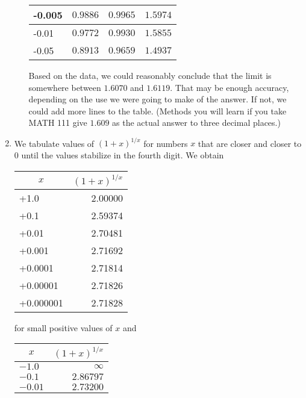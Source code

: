 \documentclass{article}
\begin{document}
\begin{enumerate}
\begin{enumerate}
\begin{center}
\begin{tabular}{|l|r|r|r|}
        \hline
        -0.005  &  $0.9886$ & $0.9965$ & $1.5974$ \\
        \hline
        -0.01   &  $0.9772$ & $0.9930$ & $1.5855$ \\
        \hline
        -0.05   &  $0.8913$ & $0.9659$ & $1.4937$ \\
      \hline
      \end{tabular}
    \end{center}
    Based on the data, we could reasonably conclude that the limit is
    somewhere between $1.6070$ and $1.6119$.  That may be enough
    accuracy, depending on the use we were going to make of the
    answer.  If not, we could add more lines to the table.  (Methods
    you will learn if you take MATH 111 give $1.609$ as the actual
    answer to three decimal places.)
  \end{enumerate}
\item %
  We tabulate values of $(1+x)^{1/x}$ for numbers $x$ that are closer
  and closer to $0$ until the values stabilize in the fourth digit.
  We obtain
  \begin{center}
    \begin{tabular}{|l|r|}
      \hline
      \multicolumn{1}{|c|}{$x$}
      & \multicolumn{1}{|c|}{$(1+x)^{1/x}$} \\
      \hline\hline
      +1.0      & 2.00000 \\
      \hline
      +0.1      & 2.59374 \\
      \hline
      +0.01     & 2.70481 \\
      \hline
      +0.001    & 2.71692 \\
      \hline
      +0.0001   & 2.71814 \\
      \hline
      +0.00001  & 2.71826 \\
      \hline 
      +0.000001 & 2.71828 \\
      \hline
    \end{tabular}
  \end{center}
  for small positive values of $x$ and
  \begin{center}
    \begin{tabular}{|l|r|}
      \hline
      \multicolumn{1}{|c|}{$x$}
      & \multicolumn{1}{|c|}{$(1+x)^{1/x}$} \\
      \hline\hline
      $-1.0$     & $\infty$ \\
      \hline
      $-0.1$     & $2.86797$ \\
      \hline
      $-0.01$    & $2.73200$ \\

\end{tabular}
\end{center}
\end{enumerate}
\end{document}
